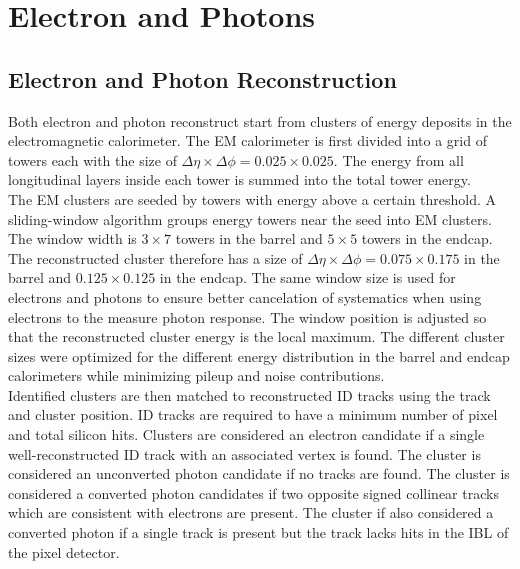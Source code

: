 \section{Electron and Photons}
\label{sec:reco:EM}

\subsection{Electron and Photon Reconstruction}
\label{sec:EM:reco}

\indent Both electron and photon reconstruct start from clusters of energy deposits in the electromagnetic calorimeter.  The EM calorimeter is first divided into a grid of towers each with the size of $\Delta \eta \times \Delta \phi = 0.025 \times 0.025$.  The energy from all longitudinal layers inside each tower is summed into the total tower energy.  \\

\indent The EM clusters are seeded by towers with energy above a certain threshold.  A sliding-window algorithm groups energy towers near the seed into EM clusters.\cite{EMReco13TeV,EMReco8TeV}  The window width is $3 \times 7$ towers in the barrel and $5 \times 5$ towers in the endcap.  The reconstructed cluster therefore has a size of $\Delta \eta \times \Delta \phi = 0.075 \times 0.175$ in the barrel and $ 0.125 \times 0.125$ in the endcap.  The same window size is used for electrons and photons to ensure better cancelation of systematics when using electrons to the measure photon response.\cite{EMReco13TeV}  The window position is adjusted so that the reconstructed cluster energy is the local maximum.  The different cluster sizes were optimized for the different energy distribution in the barrel and endcap calorimeters while minimizing pileup and noise contributions.\cite{EMReco13TeV}  \\

\indent Identified clusters are then matched to reconstructed ID tracks using the track and cluster position.  ID tracks are required to have a minimum number of pixel and total silicon hits.  Clusters are considered an electron candidate if a single well-reconstructed ID track with an associated vertex is found.  The cluster is considered an unconverted photon candidate if no tracks are found.  The cluster is considered a converted photon candidates if two opposite signed collinear tracks which are consistent with electrons are present.  The cluster if also considered a converted photon if a single track is present but the track lacks hits in the IBL of the pixel detector.  \\

